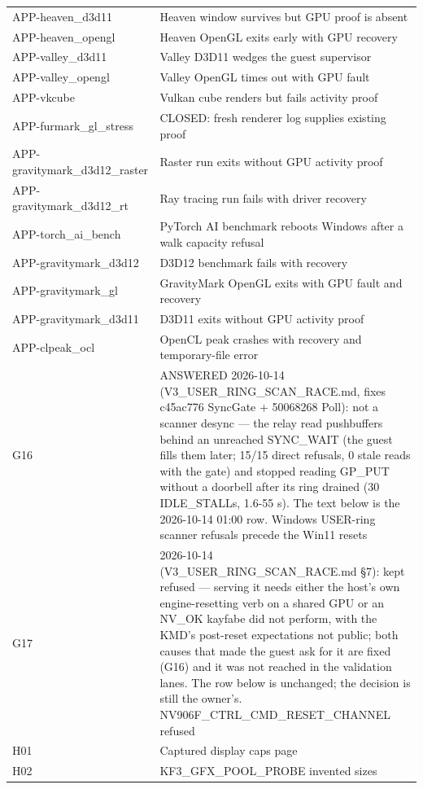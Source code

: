 {\begin{longtable}{@{}p{38mm}p{117mm}@{}}
APP-heaven\_d3d11 & Heaven window survives but GPU proof is absent \\
APP-heaven\_opengl & Heaven OpenGL exits early with GPU recovery \\
APP-valley\_d3d11 & Valley D3D11 wedges the guest supervisor \\
APP-valley\_opengl & Valley OpenGL times out with GPU fault \\
APP-vkcube & Vulkan cube renders but fails activity proof \\
APP-furmark\_gl\_stress & CLOSED: fresh renderer log supplies existing proof \\
APP-gravitymark\_d3d12\_raster & Raster run exits without GPU activity proof \\
APP-gravitymark\_d3d12\_rt & Ray tracing run fails with driver recovery \\
APP-torch\_ai\_bench & PyTorch AI benchmark reboots Windows after a walk capacity refusal \\
APP-gravitymark\_d3d12 & D3D12 benchmark fails with recovery \\
APP-gravitymark\_gl & GravityMark OpenGL exits with GPU fault and recovery \\
APP-gravitymark\_d3d11 & D3D11 exits without GPU activity proof \\
APP-clpeak\_ocl & OpenCL peak crashes with recovery and temporary-file error \\
G16 &  ANSWERED 2026-10-14 (V3\_USER\_RING\_SCAN\_RACE.md, fixes c45ac776 SyncGate + 50068268 Poll):
  not a scanner desync — the relay read pushbuffers behind an unreached SYNC\_WAIT (the guest fills
  them later; 15/15 direct refusals, 0 stale reads with the gate) and stopped reading GP\_PUT
  without a doorbell after its ring drained (30 IDLE\_STALLs, 1.6-55 s). The text below is the
  2026-10-14 01:00 row. Windows USER-ring scanner refusals precede the Win11 resets \\
G17 &  2026-10-14 (V3\_USER\_RING\_SCAN\_RACE.md §7): kept refused — serving it needs either the
  host's own engine-resetting verb on a shared GPU or an NV\_OK kayfabe did not perform, with the
  KMD's post-reset expectations not public; both causes that made the guest ask for it are fixed
  (G16) and it was not reached in the validation lanes. The row below is unchanged; the decision is
  still the owner's. NV906F\_CTRL\_CMD\_RESET\_CHANNEL refused \\
H01 & Captured display caps page \\
H02 & KF3\_GFX\_POOL\_PROBE invented sizes \\

\end{longtable}}

